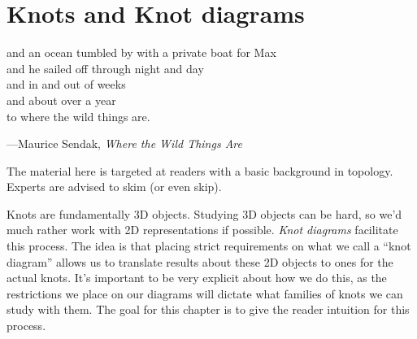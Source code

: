 \chapter{Knots and Knot diagrams}\label{chap:knots-and-knot-diagrams}
\setlength{}
\epigraph{and an ocean tumbled by with a private boat for Max\\
and he sailed off through night and day\\
and in and out of weeks\\
and about over a year\\
to where the wild things are.}{---Maurice Sendak, \emph{Where the Wild
Things Are}}
The material here is targeted at readers with a basic background in
topology. Experts are advised to skim (or even skip).




Knots are fundamentally 3D objects. Studying 3D objects can be hard,
so we'd much rather work with 2D representations if possible.
\emph{Knot diagrams} facilitate this process. The idea is that placing
strict requirements on what we call a ``knot diagram'' allows us to
translate results about these 2D objects to ones for the actual knots.
It's important to be very explicit about how we do this, as the
restrictions we place on our diagrams will dictate what families of
knots we can study with them. The goal for this chapter is to give the
reader intuition for this process.

